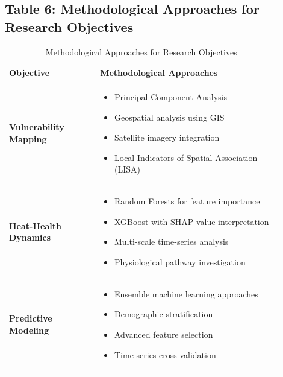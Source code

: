 \graphicspath{{./}{./sections/images/}{./images/}}\documentclass[12pt,a4paper,landscape]{article}
\begin{document}
\subsection*{Table 6: Methodological Approaches for Research Objectives}
\begin{table}[H]
\centering
\caption{Methodological Approaches for Research Objectives}
\label{tab:research_objectives}
\begin{tabular}{L{0.3\linewidth}L{0.6\linewidth}}
\toprule
\textbf{Objective} & \textbf{Methodological Approaches} \\
\midrule
\textbf{Vulnerability Mapping} & 
\begin{itemize}[leftmargin=*]
    \item Principal Component Analysis
    \item Geospatial analysis using GIS
    \item Satellite imagery integration
    \item Local Indicators of Spatial Association (LISA)
\end{itemize} \\
\midrule
\textbf{Heat-Health Dynamics} & 
\begin{itemize}[leftmargin=*]
    \item Random Forests for feature importance
    \item XGBoost with SHAP value interpretation
    \item Multi-scale time-series analysis
    \item Physiological pathway investigation
\end{itemize} \\
\midrule
\textbf{Predictive Modeling} & 
\begin{itemize}[leftmargin=*]
    \item Ensemble machine learning approaches
    \item Demographic stratification
    \item Advanced feature selection
    \item Time-series cross-validation
\end{itemize} \\
\bottomrule
\end{tabular}
\end{table}

\end{document}
